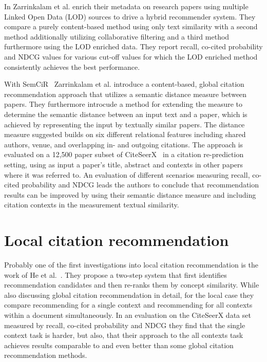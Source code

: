 In \cite{Zarrinkalam2012} Zarrinkalam et al. enrich their metadata on research papers using multiple Linked Open Data (LOD) sources to drive a hybrid recommender system. They compare a purely content-based method using only text similarity with a second method additionally utilizing collaborative filtering and a third method furthermore using the LOD enriched data. They report recall, co-cited probability and NDCG values for various cut-off values for which the LOD enriched method consistently achieves the best performance.

With SemCiR~\cite{Zarrinkalam2013} Zarrinkalam et al. introduce a content-based, global citation recommendation approach that utilizes a semantic distance measure between papers. They furthermore introcude a method for extending the measure to determine the semantic distance between an input text and a paper, which is achieved by representing the input by textually similar papers. The distance measure suggested builds on six different relational features including shared authors, venue, and overlapping in- and outgoing citations. The approach is evaluated on a 12,500 paper subset of CiteSeerX~\cite{Caragea2014} in a citation re-prediction setting, using as input a paper's title, abstract and contexts in other papers where it was referred to. An evaluation of different scenarios measuring recall, co-cited probability and NDCG leads the authors to conclude that recommendation results can be improved by using their semantic distance measure and including citation contexts in the measurement textual similarity.





\section{Local citation recommendation}

Probably one of the first investigations into local citation recommendation is the work of He et al.~\cite{He2010}. They propose a two-step system that first identifies recommendation candidates and then re-ranks them by concept similarity. While also discussing global citation recommendation in detail, for the local case they compare recommending for a single context and recommending for all contexts within a document simultaneously. In an evaluation on the CiteSeerX data set measured by recall, co-cited probability and NDCG they find that the single context task is harder, but also, that their approach to the all contexts task achieves results comparable to and even better than some global citation recommendation methods.


